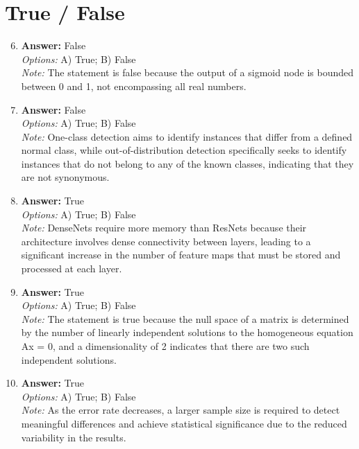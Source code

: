 \documentclass[12pt]{article}
\begin{document}
\section*{True / False}
\begin{enumerate}[label=\arabic*.]
\setcounter{enumi}{5}
\item \textbf{Answer:} False
\\ \textit{Options:} A) True; B) False
\\ \textit{Note:} The statement is false because the output of a sigmoid node is bounded between 0 and 1, not encompassing all real numbers.
\item \textbf{Answer:} False
\\ \textit{Options:} A) True; B) False
\\ \textit{Note:} One-class detection aims to identify instances that differ from a defined normal class, while out-of-distribution detection specifically seeks to identify instances that do not belong to any of the known classes, indicating that they are not synonymous.
\item \textbf{Answer:} True
\\ \textit{Options:} A) True; B) False
\\ \textit{Note:} DenseNets require more memory than ResNets because their architecture involves dense connectivity between layers, leading to a significant increase in the number of feature maps that must be stored and processed at each layer.
\item \textbf{Answer:} True
\\ \textit{Options:} A) True; B) False
\\ \textit{Note:} The statement is true because the null space of a matrix is determined by the number of linearly independent solutions to the homogeneous equation Ax = 0, and a dimensionality of 2 indicates that there are two such independent solutions.
\item \textbf{Answer:} True
\\ \textit{Options:} A) True; B) False
\\ \textit{Note:} As the error rate decreases, a larger sample size is required to detect meaningful differences and achieve statistical significance due to the reduced variability in the results.
\end{enumerate}
\end{document}
